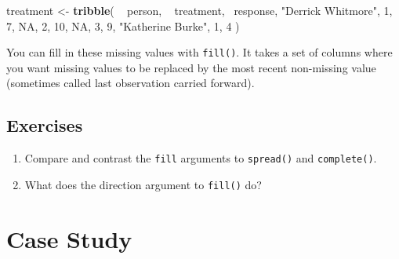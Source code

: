 \documentclass[]{book}
\newenvironment{Shaded}{\begin{snugshade}}{\end{snugshade}}
\newcommand{\KeywordTok}[1]{\textcolor[rgb]{0.13,0.29,0.53}{\textbf{{#1}}}}
\newcommand{\DecValTok}[1]{\textcolor[rgb]{0.00,0.00,0.81}{{#1}}}
\newcommand{\StringTok}[1]{\textcolor[rgb]{0.31,0.60,0.02}{{#1}}}
\newcommand{\CommentTok}[1]{\textcolor[rgb]{0.56,0.35,0.01}{\textit{{#1}}}}
\newcommand{\OtherTok}[1]{\textcolor[rgb]{0.56,0.35,0.01}{{#1}}}
\newcommand{\NormalTok}[1]{{#1}}
\begin{document}
\begin{Shaded}
\begin{Highlighting}[]
\NormalTok{treatment <-}\StringTok{ }\KeywordTok{tribble}\NormalTok{(}
  \NormalTok{~}\StringTok{ }\NormalTok{person,           ~}\StringTok{ }\NormalTok{treatment, ~response,}
  \StringTok{"Derrick Whitmore"}\NormalTok{, }\DecValTok{1}\NormalTok{,           }\DecValTok{7}\NormalTok{,}
  \OtherTok{NA}\NormalTok{,                 }\DecValTok{2}\NormalTok{,           }\DecValTok{10}\NormalTok{,}
  \OtherTok{NA}\NormalTok{,                 }\DecValTok{3}\NormalTok{,           }\DecValTok{9}\NormalTok{,}
  \StringTok{"Katherine Burke"}\NormalTok{,  }\DecValTok{1}\NormalTok{,           }\DecValTok{4}
\NormalTok{)}
\end{Highlighting}
\end{Shaded}

You can fill in these missing values with \texttt{fill()}. It takes a
set of columns where you want missing values to be replaced by the most
recent non-missing value (sometimes called last observation carried
forward).

\begin{Shaded}
\end{Shaded}

\subsection{Exercises}\label{exercises-24}

\begin{enumerate}
\def\labelenumi{\arabic{enumi}.}
\item
  Compare and contrast the \texttt{fill} arguments to \texttt{spread()}
  and \texttt{complete()}.
\item
  What does the direction argument to \texttt{fill()} do?
\end{enumerate}

\section{Case Study}\label{case-study}
\end{document}
